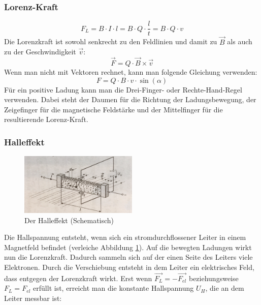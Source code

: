 \documentclass[a4paper]{article}
\begin{document}
			\subsubsection{Lorenz-Kraft}
			
				\begin{equation}
					F_L=B\cdot I \cdot l = B\cdot Q \cdot \frac{l}{t} = B\cdot Q \cdot v
				\end{equation}
				Die Lorenzkraft ist sowohl senkrecht zu den Feldlinien und damit zu $\vec{B}$ als auch zu der Geschwindigkeit $\vec{v}$: 
				\begin{equation}
					\vec{F}=Q\cdot \vec{B}\times\vec{v}
				\end{equation}
				Wenn man nicht mit Vektoren rechnet, kann man folgende Gleichung verwenden:
				\begin{equation}
				F=Q\cdot B\cdot v \cdot \sin(\alpha)
				\end{equation}
				Für ein positive Ladung kann man die Drei-Finger- oder Rechte-Hand-Regel verwenden. Dabei steht der Daumen für die Richtung der Ladungsbewegung, der Zeigefinger für die magnetische Feldstärke und der Mittelfinger für die resultierende Lorenz-Kraft.\
				
				
		\subsubsection{Halleffekt}
		
			\begin{figure}[H]
				\centering
				\includegraphics[width=0.5\textwidth]{img/halleffekt.jpg}
				\caption{Der Halleffekt (Schematisch)}
				\label{img:halleffekt}
			\end{figure}
		
			Die Hallspannung entsteht, wenn sich ein stromdurchflossener Leiter in einem Magnetfeld befindet (verleiche Abbildung \ref{img:halleffekt}). Auf die bewegten Ladungen wirkt nun die Lorenzkraft. Dadurch sammeln sich auf der einen Seite des Leiters viele Elektronen. Durch die Verschiebung entsteht in dem Leiter ein elektrisches Feld, dass entgegen der Lorenzkraft wirkt. Erst wenn $\vec{F_L} = -\vec{F_{el}}$  beziehungsweise $F_L = F_{el}$ erfüllt ist, erreicht man die konstante Hallspannung $U_H$, die an dem Leiter messbar ist:
			
\end{document}
